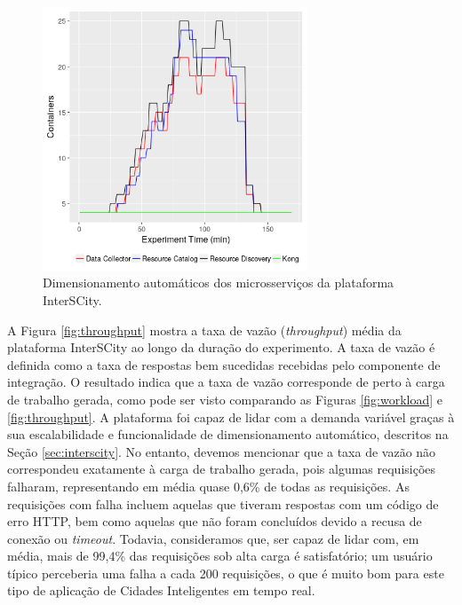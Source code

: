 \begin{figure}[ht]
	\centering
	\includegraphics[width=0.7\textwidth]{figuras/auto-scaling.png}
    \caption{Dimensionamento automáticos dos microsserviços da plataforma InterSCity.}
	\label{fig:auto-scaling}
\end{figure}


A Figura \ref{fig:throughput} mostra a taxa de vazão (\textit{throughput}) média da plataforma InterSCity ao longo da duração do experimento.
A taxa de vazão é definida como a taxa de respostas bem sucedidas recebidas pelo componente de integração.
O resultado indica que a taxa de vazão corresponde de perto à carga de trabalho gerada, como pode ser visto comparando as Figuras \ref{fig:workload} e \ref{fig:throughput}.
A plataforma foi capaz de lidar com a demanda variável graças à sua escalabilidade e funcionalidade de dimensionamento automático, descritos na Seção \ref{sec:interscity}.
No entanto, devemos mencionar que a taxa de vazão não correspondeu exatamente à carga de trabalho gerada, pois algumas requisições falharam, representando em média quase 0,6\% de todas as requisições.
As requisições com falha incluem aquelas que tiveram respostas com um código de erro HTTP, bem como aquelas que não foram concluídos devido a recusa de conexão ou \textit{timeout}.
Todavia, consideramos que, ser capaz de lidar com, em média, mais de 99,4\% das requisições sob alta carga é satisfatório; um usuário típico perceberia uma falha a cada 200 requisições, o que é muito bom para
este tipo de aplicação de Cidades Inteligentes em tempo real.

